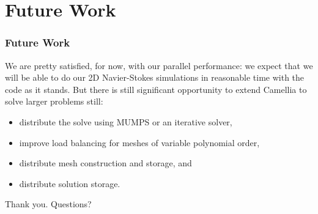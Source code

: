 \documentclass[mathserif]{beamer}
\begin{document}


\section{Future Work}
\begin{frame}
\frametitle{Future Work}
We are pretty satisfied, for now, with our parallel performance: we expect that we will be able to do our 2D Navier-Stokes simulations in reasonable time with the code as it stands.  But there is still significant opportunity to extend Camellia to solve larger problems still:
\begin{itemize}
\item distribute the solve using MUMPS or an iterative solver,
\item improve load balancing for meshes of variable polynomial order,
\item distribute mesh construction and storage, and
\item distribute solution storage.
\end{itemize}

\end{frame}

\begin{frame}
\begin{center}
  \vfill
  Thank you.
  \vfill
  Questions?
  \vfill
\end{center}
\end{frame}
\end{document}
